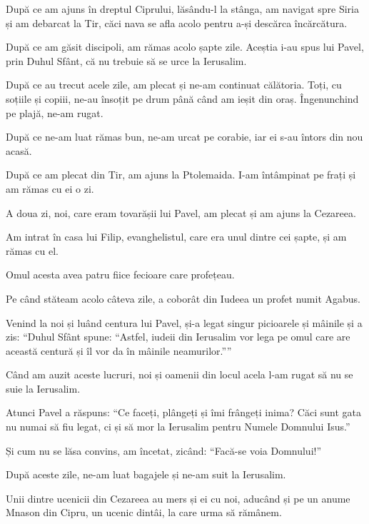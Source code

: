 {După ce am ajuns în dreptul Ciprului, lăsându-l la stânga, am navigat spre Siria și am debarcat la Tir, căci nava se afla acolo pentru a-și descărca încărcătura.

După ce am găsit discipoli, am rămas acolo șapte zile. Aceștia i-au spus lui Pavel, prin Duhul Sfânt, că nu trebuie să se urce la Ierusalim.

După ce au trecut acele zile, am plecat și ne-am continuat călătoria. Toți, cu soțiile și copiii, ne-au însoțit pe drum până când am ieșit din oraș. Îngenunchind pe plajă, ne-am rugat.

După ce ne-am luat rămas bun, ne-am urcat pe corabie, iar ei s-au întors din nou acasă.


\par }{\PP {}După ce am plecat din Tir, am ajuns la Ptolemaida. I-am întâmpinat pe frați și am rămas cu ei o zi.

A doua zi, noi, care eram tovarășii lui Pavel, am plecat și am ajuns la Cezareea.

\par }{\PP Am intrat în casa lui Filip, evanghelistul, care era unul dintre cei șapte, și am rămas cu el.

Omul acesta avea patru fiice fecioare care profețeau.

Pe când stăteam acolo câteva zile, a coborât din Iudeea un profet numit Agabus.

Venind la noi și luând centura lui Pavel, și-a legat singur picioarele și mâinile și a zis: “Duhul Sfânt spune: “Astfel, iudeii din Ierusalim vor lega pe omul care are această centură și îl vor da în mâinile neamurilor.””


\par }{\PP {}Când am auzit aceste lucruri, noi și oamenii din locul acela l-am rugat să nu se suie la Ierusalim.

Atunci Pavel a răspuns: “Ce faceți, plângeți și îmi frângeți inima? Căci sunt gata nu numai să fiu legat, ci și să mor la Ierusalim pentru Numele Domnului Isus.”


\par }{\PP {}Și cum nu se lăsa convins, am încetat, zicând: “Facă-se voia Domnului!”


\par }{\PP {}După aceste zile, ne-am luat bagajele și ne-am suit la Ierusalim.

Unii dintre ucenicii din Cezareea au mers și ei cu noi, aducând și pe un anume Mnason din Cipru, un ucenic dintâi, la care urma să rămânem.


}
